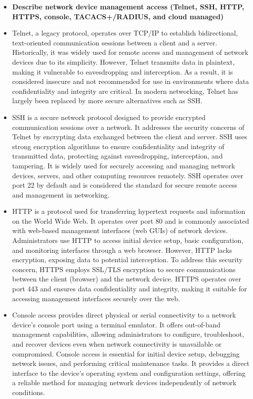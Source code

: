 \documentclass{article}
\begin{document}
\begin{itemize}
  \item \textbf{Describe network device management access (Telnet, SSH, HTTP, HTTPS, console, TACACS+/RADIUS, and cloud managed)}
  	\item[] Telnet, a legacy protocol, operates over TCP/IP to establish bidirectional, text-oriented communication sessions between a client and a server. Historically, it was widely used for remote access and management of network devices due to its simplicity. However, Telnet transmits data in plaintext, making it vulnerable to eavesdropping and interception. As a result, it is considered insecure and not recommended for use in environments where data confidentiality and integrity are critical. In modern networking, Telnet has largely been replaced by more secure alternatives such as SSH.
	\item[] SSH is a secure network protocol designed to provide encrypted communication sessions over a network. It addresses the security concerns of Telnet by encrypting data exchanged between the client and server. SSH uses strong encryption algorithms to ensure confidentiality and integrity of transmitted data, protecting against eavesdropping, interception, and tampering. It is widely used for securely accessing and managing network devices, servers, and other computing resources remotely. SSH operates over port 22 by default and is considered the standard for secure remote access and management in networking.
	\item[] HTTP is a protocol used for transferring hypertext requests and information on the World Wide Web. It operates over port 80 and is commonly associated with web-based management interfaces (web GUIs) of network devices. Administrators use HTTP to access initial device setup, basic configuration, and monitoring interfaces through a web browser. However, HTTP lacks encryption, exposing data to potential interception. To address this security concern, HTTPS employs SSL/TLS encryption to secure communications between the client (browser) and the network device. HTTPS operates over port 443 and ensures data confidentiality and integrity, making it suitable for accessing management interfaces securely over the web.
	\item[] Console access provides direct physical or serial connectivity to a network device's console port using a terminal emulator. It offers out-of-band management capabilities, allowing administrators to configure, troubleshoot, and recover devices even when network connectivity is unavailable or compromised. Console access is essential for initial device setup, debugging network issues, and performing critical maintenance tasks. It provides a direct interface to the device's operating system and configuration settings, offering a reliable method for managing network devices independently of network conditions.

\end{itemize}
\end{document}
